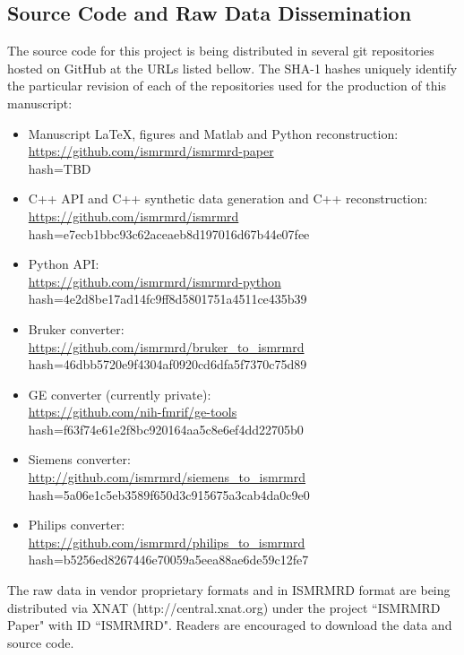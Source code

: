 \documentclass[12pt]{article}
\begin{document}
\subsection*{Source Code and Raw Data Dissemination}
The source code for this project is being distributed in several git repositories hosted on GitHub at the URLs listed bellow.  The SHA-1 hashes uniquely identify the particular revision of each of the repositories used for the production of this manuscript:
\begin{itemize}
\item Manuscript LaTeX, figures and Matlab and Python reconstruction: \\
	\url{https://github.com/ismrmrd/ismrmrd-paper} \\
	hash=TBD
\item C++ API and C++ synthetic data generation and C++ reconstruction: \\
	\url{https://github.com/ismrmrd/ismrmrd} \\
    	hash=e7ecb1bbc93c62aceaeb8d197016d67b44e07fee
\item Python API: \\
	\url{https://github.com/ismrmrd/ismrmrd-python} \\
	hash=4e2d8be17ad14fc9ff8d5801751a4511ce435b39
\item Bruker converter: \\
	\url{https://github.com/ismrmrd/bruker_to_ismrmrd}\\
	hash=46dbb5720e9f4304af0920cd6dfa5f7370c75d89
\item GE converter (currently private):\\
	 \url{https://github.com/nih-fmrif/ge-tools} \\
	 hash=f63f74e61e2f8bc920164aa5c8e6ef4dd22705b0
\item Siemens converter: \\
	 \url{http://github.com/ismrmrd/siemens_to_ismrmrd}\\
	 hash=5a06e1c5eb3589f650d3c915675a3cab4da0c9e0
\item Philips converter:\\
	\url{https://github.com/ismrmrd/philips_to_ismrmrd}\\
	hash=b5256ed8267446e70059a5eea88ae6de59c12fe7
\end{itemize}
The raw data in vendor proprietary formats and in ISMRMRD format are being distributed via XNAT (http://central.xnat.org) under the project ``ISMRMRD Paper" with ID ``ISMRMRD".  Readers are encouraged to download the data and source code.
\end{document}
